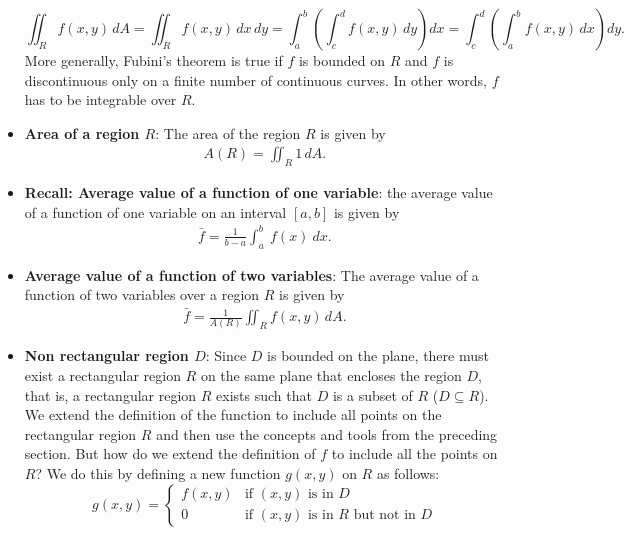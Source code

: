 \documentclass{report}
\begin{document}
\begin{itemize}
            \[
                \iint_{R} f(x,y) \, dA = \iint_{R} f(x,y) \, dx \, dy = \int_{a}^{b} \left( \int_{c}^{d} f(x,y) \, dy \right) dx = \int_{c}^{d} \left( \int_{a}^{b} f(x,y) \, dx \right) dy.
            \]
            More generally, Fubini’s theorem is true if $f$ is bounded on $R$ and $f$ is discontinuous only on a finite number of continuous curves. In other words, $f$ has to be integrable over $R$.
            \bigbreak \noindent 
        \item \textbf{Area of a region $R$}:
            The area of the region $R$ is given by  
            \begin{align*}
                A(R) = \iint_{R}1\,dA
            .\end{align*}
        \item \textbf{Recall: Average value of a function of one variable}: the average value of a function of one variable on an interval  $[a,b]$ is given by
            \begin{align*}
                \bar{f} = \frac{1}{b-a}\int_{a}^{b}\ f(x)\ dx
            .\end{align*}
        \item \textbf{Average value of a function of two variables}: The average value of a function of two variables over a region $R$ is given by
            \begin{align*}
                \bar{f} = \frac{1}{A(R)} \iint_{R}f(x,y)\,dA
            .\end{align*}
        \item \textbf{Non rectangular region $D$}:
            Since \(D\) is bounded on the plane, there must exist a rectangular region \(R\) on the same plane that encloses the region \(D\), that is, a rectangular region \(R\) exists such that \(D\) is a subset of \(R\) (\(D \subseteq R\)).
            \bigbreak \noindent 
            We extend the definition of the function to include all points on the rectangular region \(R\) and then use the concepts and tools from the preceding section. But how do we extend the definition of \(f\) to include all the points on \(R\)? We do this by defining a new function \(g(x,y)\) on \(R\) as follows:
            \[
                g(x,y) = 
                \begin{cases} 
                    f(x,y) & \text{if } (x,y) \text{ is in } D \\
                    0 & \text{if } (x,y) \text{ is in } R \text{ but not in } D
                \end{cases}
\]
\end{itemize}
\end{document}
